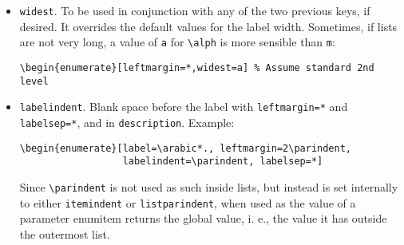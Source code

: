 \documentclass{article}
\begin{document}
\begin{itemize}
As before, the label starts at the same place as the surrounding text,
then comes the label, the space after it and the item body.  The
difference between \verb|labelsep=*| and \verb|leftmargin=*| is that
in the former the item body begins at a fixed place (namely,
\verb|leftmargin|), while the latter begins at a variable place
depending on the label (but always the same within a list, of course).
Most of times, what you would want is \verb|leftmargin=*|.

Unfortunately, \verb|labelsep| has not a default value
to be applied to all lists---simply the current value
is used. If you nest a \verb|leftmargin=*| within a
\verb|labelsep=*|, the value to compute the left margin
is not what you could expect. The way \LaTeX{} assigns values
to the list parameters is one of the things which makes
redefining lists a mess, but with \textsf{enumitem} you can
set default values for every list, as described below.
In this case, all you need is:
\begin{verbatim}
\setlist{itemsep=.5em}
\end{verbatim}


\item \verb|widest|. To be used in conjunction with any of the
two previous keys, if desired. It overrides the default
values for the label width. Sometimes, if lists are not very
long, a value of \verb|a| for \verb|\alph| is more sensible
than \verb|m|:
\begin{verbatim}
\begin{enumerate}[leftmargin=*,widest=a] % Assume standard 2nd level
\end{verbatim}

\item \verb|labelindent|. Blank space before the label
with \verb|leftmargin=*| and \verb|labelsep=*|, and in
\verb|description|. Example:
\begin{verbatim}
\begin{enumerate}[label=\arabic*., leftmargin=2\parindent, 
                  labelindent=\parindent, labelsep=*]
\end{verbatim}

Since \verb|\parindent| is not used as such inside lists, but instead
is set internally to either \verb|itemindent| or \verb|listparindent|,
when used as the value of a parameter \textsf{enumitem} returns the
global value, i.  e., the value it has outside the outermost list.
\end{itemize}
\end{document}
